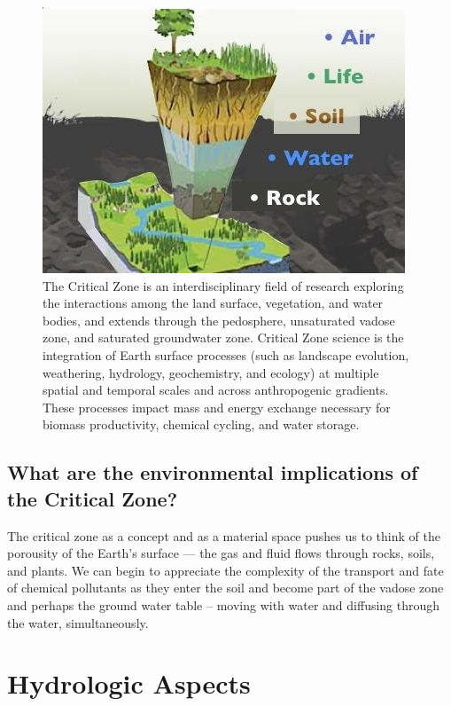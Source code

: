 \documentclass{book}\usepackage{knitr}
\begin{document}
\begin{knitrout}
\begin{kframe}
\begin{figure}
\includegraphics[width=\textwidth]{images/critical-zone/criticalzone.jpg}
\caption{The Critical Zone is an interdisciplinary field of research exploring the interactions among the land surface, vegetation, and water bodies, and extends through the pedosphere, unsaturated vadose zone, and saturated groundwater zone. Critical Zone science is the integration of Earth surface processes (such as landscape evolution, weathering, hydrology, geochemistry, and ecology) at multiple spatial and temporal scales and across anthropogenic gradients. These processes impact mass and energy exchange necessary for biomass productivity, chemical cycling, and water storage.}
\label{fig:criticalzone}
\end{figure}

\subsection{What are the environmental implications of the Critical Zone?}

The critical zone as a concept and as a material space pushes us to think of the porousity of the Earth's surface --- the gas and fluid flows through rocks, soils, and plants. We can begin to appreciate the complexity of the transport and fate of chemical pollutants as they enter the soil and become part of the vadose zone and perhaps the ground water table -- moving with water and diffusing through the water, simultaneously.

\section{Hydrologic Aspects}


\end{kframe}
\end{knitrout}
\end{document}
